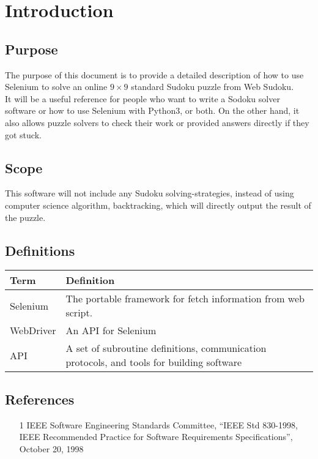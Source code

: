 \documentclass{article}
\title{}
\author{}
\date{}
\begin{document}
\section{Introduction}
	\subsection{Purpose}
	The purpose of this document is to provide a detailed description of how 
	to use Selenium to solve an online $9 \times 9$ standard Sudoku puzzle 
	from Web Sudoku.
	\\[0.5cm]
	It will be a useful reference for people who want to write a Sodoku 
	solver software or how to use Selenium with Python3, or both. On the 
	other hand, it also allows puzzle solvers to check their work or 
	provided answers directly if they got stuck. 
	
	\subsection{Scope}
	This software will not include any Sudoku solving-strategies, instead 
	of using computer science algorithm, backtracking, which will directly 
	output the result of the puzzle.  

	\subsection{Definitions}
	\begin{center}
	\begin{tabular}{ | l | l | }
	\hline
	Term 	 & Definition 						\\
	\hline
	Selenium & The portable framework for fetch information from web script. \\
	\hline
	WebDriver& An API for Selenium 					\\
	\hline
	API 	 & A set of subroutine definitions, communication protocols, 
		and tools for building software				\\
	\hline
	\end{tabular}
	\end{center}
	\subsection{References}
	\begin{itemize}
		\item[1] IEEE Software Engineering Standards Committee, ``IEEE
			Std 830-1998, IEEE Recommended Practice for Software
			Requirements Specifications'', October 20, 1998
	\end{itemize}
\end{document}
